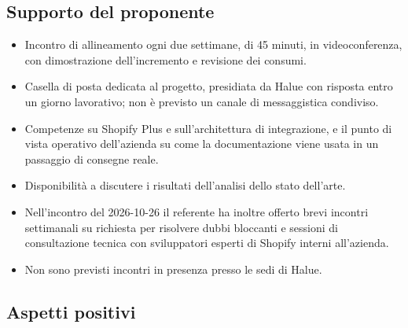 \subsection{Supporto del proponente}

\begin{itemize}
    \item Incontro di allineamento ogni due settimane, di 45 minuti, in videoconferenza, con dimostrazione dell'incremento e revisione dei consumi.
    \item Casella di posta dedicata al progetto, presidiata da Halue con risposta entro un giorno lavorativo; non è previsto un canale di messaggistica condiviso.
    \item Competenze su Shopify Plus e sull'architettura di integrazione, e il punto di vista operativo dell'azienda su come la documentazione viene usata in un passaggio di consegne reale.
    \item Disponibilità a discutere i risultati dell'analisi dello stato dell'arte.
    \item Nell'incontro del 2026-10-26 il referente ha inoltre offerto brevi incontri settimanali su richiesta per risolvere dubbi bloccanti e sessioni di consultazione tecnica con sviluppatori esperti di Shopify interni all'azienda.
    \item Non sono previsti incontri in presenza presso le sedi di Halue.
\end{itemize}

\subsection{Aspetti positivi}

